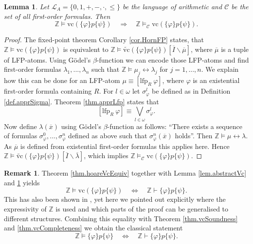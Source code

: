 \documentclass[acmsmall]{acmart}
\theoremstyle{plain}
\newtheorem{lemma}[theorem]{Lemma}
\theoremstyle{definition}
\newtheorem{remark}[theorem]{Remark}
\newcommand{\calL}{\mathcal{L}}
\newcommand{\calC}{\mathcal{C}}
\renewcommand{\phi}{\varphi}
\newcommand{\mybar}[1]{\overline{#1}}
\newcommand{\Int}{\mathbb{Z}}
\newcommand{\sop}{[} %
\newcommand{\scl}{]} %
\newcommand{\sel}[2]{#1 \backslash #2} %
\newcommand{\unsubst}[2]{\sop \sel{#1}{#2} \scl} %
\newcommand{\liff}{\leftrightarrow} %
\newcommand{\lfp}{\mathrm{lfp}} %
\newcommand{\hoare}[3]{\{#1\}#2\{#3\}}
\newcommand{\vc}{\mathrm{vc}}
\newcommand{\vct}{\tilde{\vc}}
\begin{document}
\begin{lemma}\label{lem.abstractInt}
	Let $\calL_A = \{0,1,+,-,\cdot,\leq\}$ be the language of arithmetic and $\calC$ be the set of all first-order formulas. Then 
	\[
		\Int \models \vc(\hoare{\varphi}{p}{\psi}) \quad \Rightarrow \quad \Int \models_{\calC} \vc(\hoare{\varphi}{p}{\psi}).
	\]
\end{lemma}
\begin{proof}
	The fixed-point theorem Corollary \ref{cor.HornFP} states, that $\Int \models \vc(\hoare{\varphi}{p}{\psi})$ is equivalent to $\Int \models \vct(\hoare{\varphi}{p}{\psi})\unsubst{\mybar{I}}{\mybar{\mu}}$, where $\mybar{\mu}$ is a tuple of LFP-atoms. Using Gödel's $\beta$-function we can encode those LFP-atoms and find first-order formulas $\lambda_1,...,\lambda_n$ such that $\Int \models \mu_j \leftrightarrow \lambda_j$ for $j = 1,...,n$. We explain how this can be done for an LFP-atom $\mu \equiv [\lfp_R ~ \phi]$, where $\phi$ is an existential first-order formula containing $R$. For $l \in \omega$ let $\sigma_\phi^l$ be defined as in Definition \ref{def.apprSigma}. Theorem \ref{thm.apprLfp} states that 
	\[[\lfp_R ~ \phi] \equiv \bigvee_{l\in \omega} \sigma_\phi^l. \]
	Now define $\lambda(\mybar{x})$ using Gödel's $\beta$-function as follows: ``There exists a sequence of formulas $\sigma_\phi^0,...,\sigma_\phi^n$ defined as above such that $\sigma_\phi^n(\mybar{x})$ holds''. Then $\Int \models \mu \liff \lambda$. 
	As $\mybar{\mu}$ is defined from existential first-order formulas this applies here. 	
	Hence $\Int \models \vct(\hoare{\varphi}{p}{\psi}) \unsubst{\mybar{I}}{\mybar{\lambda}}$, which implies $\Int \models_{\calC} \vc(\hoare{\varphi}{p}{\psi})$.
\end{proof}

\begin{remark}\label{rem.hoareVcEquiv}
	 Theorem \ref{thm.hoareVcEquiv} together with Lemma \ref{lem.abstractVc} and \ref{lem.abstractInt} yields
	\[
	\Int \models \vc(\hoare{\varphi}{p}{\psi})\quad \Leftrightarrow \quad \Int \vdash \hoare{\varphi}{p}{\psi}.
	\]
	This has also been shown in \cite{Kloibhofer20Fixed}, yet here we pointed out explicitly where the expressivity of $\Int$ is used and which parts of the proof can be generalised to different structures. Combining this equality with Theorem \ref{thm.vcSoundness} and \ref{thm.vcCompleteness} we obtain the classical statement
	\[
	\Int \models \hoare{\varphi}{p}{\psi}\quad \Leftrightarrow \quad \Int \vdash \hoare{\varphi}{p}{\psi}.
	\]
\end{remark}
\end{document}

